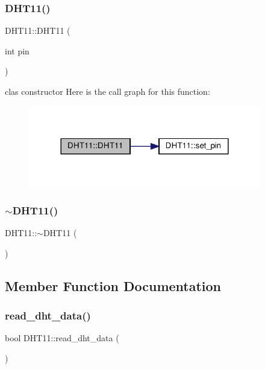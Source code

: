 \subsubsection{\texorpdfstring{D\+H\+T11()}{DHT11()}}
{\footnotesize\ttfamily D\+H\+T11\+::\+D\+H\+T11 (\begin{DoxyParamCaption}\item[{int}]{pin }\end{DoxyParamCaption})}

clas constructor Here is the call graph for this function\+:
\nopagebreak
\begin{figure}[H]
\begin{center}
\leavevmode
\includegraphics[width=288pt]{classDHT11_ad52a70ab511e087aaad53848d64ee976_cgraph}
\end{center}
\end{figure}
\mbox{\label{classDHT11_af210e94620802c4dd3a32f826b9cc389}} 
\subsubsection{\texorpdfstring{$\sim$\+D\+H\+T11()}{~DHT11()}}
{\footnotesize\ttfamily D\+H\+T11\+::$\sim$\+D\+H\+T11 (\begin{DoxyParamCaption}{ }\end{DoxyParamCaption})\hspace{0.3cm}{\ttfamily [inline]}}



\subsection{Member Function Documentation}
\mbox{\label{classDHT11_abf4c039a75c0458ee45621c12feec0c7}} 
\subsubsection{\texorpdfstring{read\+\_\+dht\+\_\+data()}{read\_dht\_data()}}
{\footnotesize\ttfamily bool D\+H\+T11\+::read\+\_\+dht\+\_\+data (\begin{DoxyParamCaption}{ }\end{DoxyParamCaption})\hspace{0.3cm}{\ttfamily [private]}}

